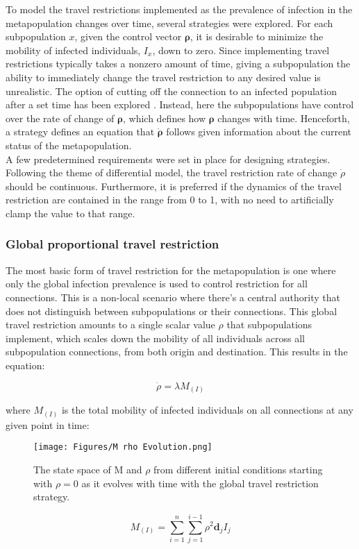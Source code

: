 To model the travel restrictions implemented as the prevalence of infection in the metapopulation changes over time, several strategies were explored. For each subpopulation $x$, given the control vector $\mathbf{\rho}$, it is desirable to minimize the mobility of infected individuals, $I_{x}$, down to zero. Since implementing travel restrictions typically takes a nonzero amount of time, giving a subpopulation the ability to immediately change the travel restriction to any desired value is unrealistic. The option of cutting off the connection to an infected population after a set time has been explored \cite{feng2020infectious}. Instead, here the subpopulations have control over the rate of change of $\mathbf{\rho}$, which defines how $\mathbf{\rho}$ changes with time. Henceforth, a strategy defines an equation that $\mathbf{\dot{\rho}}$ follows given information about the current status of the metapopulation.\\

A few predetermined requirements were set in place for designing strategies. Following the theme of differential model, the travel restriction rate of change $\dot \rho$ should be continuous. Furthermore, it is preferred if the dynamics of the travel restriction are contained in the range from 0 to 1, with no need to artificially clamp the value to that range.

\subsubsection{Global proportional travel restriction}
The most basic form of travel restriction for the metapopulation is one where only the global infection prevalence is used to control restriction for all connections. This is a non-local scenario where there's a central authority that does not distinguish between subpopulations or their connections. This global travel restriction amounts to a single scalar value $\rho$ that subpopulations implement, which scales down the mobility of all individuals across all subpopulation connections, from both origin and destination. This results in the equation:

\begin{equation}
    \dot{\rho} = \lambda M_{(I)}
\end{equation}

where $M_{(I)}$ is the total mobility of infected individuals on all connections at any given point in time:
\begin{figure}
    \centering
    \texttt{[image: Figures/M rho Evolution.png]}
    \caption{\small The state space of M and $\rho$ from different initial conditions starting with $\rho=0$ as it evolves with time with the global travel restriction strategy.}
\end{figure}
\begin{equation}
M_{(I)} = \sum_{i=1}^{n} \sum_{j=1}^{i-1} \rho^2 \mathbf{d}_{j} I_{j}
\end{equation}

